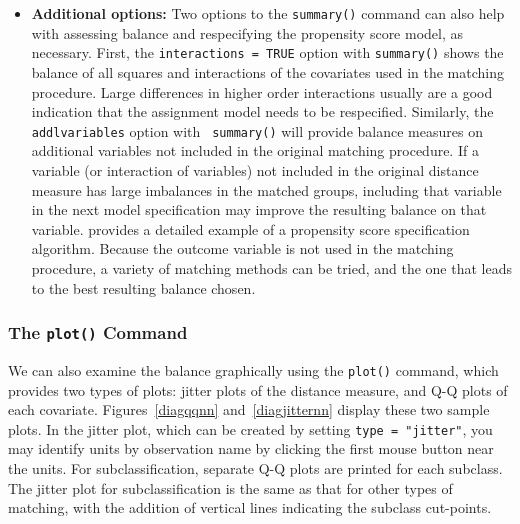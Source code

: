 \begin{itemize}
\item {\bf Additional options:} Two options to the \texttt{summary()}
  command can also help with assessing balance and respecifying the
  propensity score model, as necessary.  First, the {\tt interactions
    = TRUE} option with {\tt summary()} shows the balance of all
  squares and interactions of the covariates used in the matching
  procedure.  Large differences in higher order interactions usually
  are a good indication that the assignment model needs to be
  respecified.  Similarly, the {\tt addlvariables} option with {\tt
    summary()} will provide balance measures on additional variables
  not included in the original matching procedure.  If a variable (or
  interaction of variables) not included in the original distance
  measure has large imbalances in the matched groups, including that
  variable in the next model specification may improve the resulting
  balance on that variable.  \cite{DehWah99} provides a detailed
  example of a propensity score specification algorithm.  Because the
  outcome variable is not used in the matching procedure, a variety of
  matching methods can be tried, and the one that leads to the best
  resulting balance chosen.
\end{itemize}

\subsubsection{The \texttt{plot()} Command}

We can also examine the balance graphically using the \texttt{plot()}
command, which provides two types of plots: jitter plots of the
distance measure, and Q-Q plots of each covariate.
Figures~\ref{diagqqnn} and~\ref{diagjitternn} display these two sample
plots.  In the jitter plot, which can be created by setting
\texttt{type = "jitter"}, you may identify units by observation name
by clicking the first mouse button near the units. For
subclassification, separate Q-Q plots are printed for each subclass.
The jitter plot for subclassification is the same as that for other
types of matching, with the addition of vertical lines indicating the
subclass cut-points.

